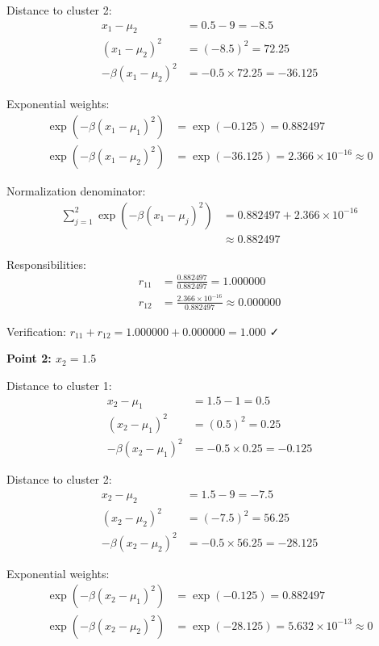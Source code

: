 \documentclass[12pt]{article}
\begin{document}
\begin{solution}
Distance to cluster 2:
\begin{align*}
x_1 - \mu_2 &= 0.5 - 9 = -8.5 \\
(x_1 - \mu_2)^2 &= (-8.5)^2 = 72.25 \\
-\beta(x_1 - \mu_2)^2 &= -0.5 \times 72.25 = -36.125
\end{align*}

Exponential weights:
\begin{align*}
\exp(-\beta(x_1 - \mu_1)^2) &= \exp(-0.125) = 0.882497 \\
\exp(-\beta(x_1 - \mu_2)^2) &= \exp(-36.125) = 2.366 \times 10^{-16} \approx 0
\end{align*}

Normalization denominator:
\begin{align*}
\sum_{j=1}^2 \exp(-\beta(x_1 - \mu_j)^2) &= 0.882497 + 2.366 \times 10^{-16} \\
&\approx 0.882497
\end{align*}

Responsibilities:
\begin{align*}
r_{11} &= \frac{0.882497}{0.882497} = 1.000000 \\
r_{12} &= \frac{2.366 \times 10^{-16}}{0.882497} \approx 0.000000
\end{align*}

Verification: $r_{11} + r_{12} = 1.000000 + 0.000000 = 1.000$ ✓

\textbf{Point 2: $x_2 = 1.5$}

Distance to cluster 1:
\begin{align*}
x_2 - \mu_1 &= 1.5 - 1 = 0.5 \\
(x_2 - \mu_1)^2 &= (0.5)^2 = 0.25 \\
-\beta(x_2 - \mu_1)^2 &= -0.5 \times 0.25 = -0.125
\end{align*}

Distance to cluster 2:
\begin{align*}
x_2 - \mu_2 &= 1.5 - 9 = -7.5 \\
(x_2 - \mu_2)^2 &= (-7.5)^2 = 56.25 \\
-\beta(x_2 - \mu_2)^2 &= -0.5 \times 56.25 = -28.125
\end{align*}

Exponential weights:
\begin{align*}
\exp(-\beta(x_2 - \mu_1)^2) &= \exp(-0.125) = 0.882497 \\
\exp(-\beta(x_2 - \mu_2)^2) &= \exp(-28.125) = 5.632 \times 10^{-13} \approx 0
\end{align*}


\end{solution}
\end{document}
